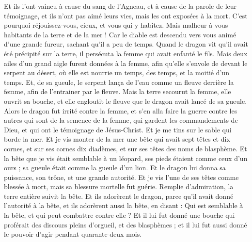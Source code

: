 \begin{multicols}{2}
Et ils l'ont vaincu à cause du sang de l'Agneau, et à cause de la parole de leur témoignage, et ils n'ont pas aimé leurs vies, mais les ont exposées à la mort.
C'est pourquoi réjouissez-vous, cieux, et vous qui y habitez. Mais malheur à vous habitants de la terre et de la mer ! Car le diable est descendu vers vous animé d'une grande fureur, sachant qu'il a peu de temps.
Quand le dragon vit qu'il avait été précipité sur la terre, il persécuta la femme qui avait enfanté le fils.
Mais deux ailes d'un grand aigle furent données à la femme, afin qu'elle s'envole de devant le serpent au désert, où elle est nourrie un temps, des temps, et la moitié d'un temps.
Et, de sa gueule, le serpent lança de l'eau comme un fleuve derrière la femme, afin de l'entrainer par le fleuve.
Mais la terre secourut la femme, elle ouvrit sa bouche, et elle engloutit le fleuve que le dragon avait lancé de sa gueule.
Alors le dragon fut irrité contre la femme, et s'en alla faire la guerre contre les autres qui sont de la semence de la femme, qui gardent les commandements de Dieu, et qui ont le témoignage de Jésus-Christ.
Et je me tins sur le sable qui borde la mer.
\VerseOne{}Et je vis monter de la mer une bête qui avait sept têtes et dix cornes, et sur ses cornes dix diadèmes, et sur ses têtes des noms de blasphème.
Et la bête que je vis était semblable à un léopard, ses pieds étaient comme ceux d'un ours ; sa gueule était comme la gueule d'un lion. Et le dragon lui donna sa puissance, son trône, et une grande autorité.
Et je vis l'une de ses têtes comme blessée à mort, mais sa blessure mortelle fut guérie. Remplie d'admiration, la terre entière suivit la bête.
Et ils adorèrent le dragon, parce qu'il avait donné l'autorité à la bête, et ils adorèrent aussi la bête, en disant : Qui est semblable à la bête, et qui peut combattre contre elle ?
Et il lui fut donné une bouche qui proférait des discours pleins d'orgueil, et des blasphèmes ; et il lui fut aussi donné le pouvoir d'agir pendant quarante-deux mois.

\end{multicols}
